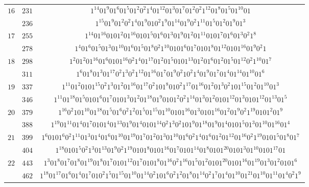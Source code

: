 \documentclass[final,3p,times]{elsarticle}
\theoremstyle{definition}
\begin{document}
\begin{appendix}
{\begin{longtable}[c]{|c|c|c|}
\hline
$16$ & $231$ & $1^{14}01^{9}01^{6}01^{5}01^{2}0^{2}1^{4}01^{12}01^{3}01^{7}01^{2}0^{2}1^{12}01^{8}01^{5}01^{10}01$\\[-1ex]
& $236$ & $1^{15}01^{9}01^{2}0^{2}1^{4}01^{9}010^{2}1^{9}01^{14}01^{9}0^{2}1^{11}01^{5}01^{2}01^{9}01^{3}$\\
\hline
$17$ & $255$ & $1^{14}01^{16}0101^{2}01^{16}0101^{5}01^{6}01^{3}01^{9}01^{2}01^{11}0101^{7}01^{6}01^{3}0^{2}1^{8}$\\[-1ex]
& $278$ & $1^{4}01^{6}01^{5}01^{3}01^{10}01^{6}01^{5}01^{8}0^{2}1^{10}0101^{6}01^{7}0101^{8}01^{12}0101^{16}01^{9}0^{2}1$\\
\hline
$18$ & $298$ & $1^{2}01^{2}01^{16}01^{6}0101^{16}0^{2}1^{4}01^{17}01^{2}01^{5}0101^{13}01^{2}01^{6}01^{2}01^{5}01^{12}0^{2}1^{10}01^{7}$\\[-1ex]
& $311$ & $1^{6}01^{8}01^{3}01^{17}0^{2}1^{3}0^{2}1^{12}01^{16}01^{7}01^{9}0^{2}10^{2}1^{4}01^{9}01^{7}01^{4}01^{14}01^{10}01^{6}$\\
\hline
$19$ & $337$ & $1^{11}01^{2}0101^{15}0^{2}1^{3}01^{2}01^{16}01^{17}0^{2}101^{8}010^{2}1^{17}01^{16}01^{2}01^{3}0^{2}101^{15}01^{2}01^{10}01^{3}$\\[-1ex]
& $346$ & $1^{11}01^{18}01^{5}0101^{6}01^{7}0101^{3}01^{2}01^{18}01^{9}0101^{2}0^{2}1^{14}01^{3}01^{2}0101^{12}01^{3}0101^{12}01^{13}01^{5}$\\
\hline
$20$ & $379$ & $1^{16}0^{2}101^{10}01^{18}01^{5}01^{6}0^{2}1^{2}01^{5}01^{15}01^{10}0101^{16}01^{3}0101^{16}01^{2}01^{9}0^{2}1^{19}0101^{2}01^{9}$\\[-1ex]
& $388$ & $1^{19}01^{11}01^{4}01^{7}0101^{4}01^{13}01^{9}01^{4}0101^{14}0^{2}1^{3}0^{2}101^{9}01^{18}01^{9}01^{4}0101^{5}01^{3}01^{10}01^{16}01^{4}$\\
\hline
$21$ & $399$ & $1^{6}0101^{6}0^{2}1^{11}01^{3}01^{4}01^{6}01^{10}01^{19}01^{7}01^{2}01^{3}01^{10}01^{6}0^{2}1^{4}01^{6}01^{2}01^{12}01^{16}0^{2}1^{19}0101^{5}01^{8}01^{7}$\\[-1ex]
& $404$ & $1^{18}0101^{5}0^{2}1^{3}01^{13}01^{9}0^{2}1^{19}0101^{8}0101^{16}01^{7}0101^{14}01^{8}0101^{20}0101^{3}01^{10}0101^{17}01$\\
\hline
$22$ & $443$ & $1^{3}01^{8}01^{7}01^{8}01^{19}01^{8}01^{7}0101^{12}01^{7}0101^{8}01^{16}0^{2}1^{16}01^{5}01^{2}0101^{20}0101^{16}01^{19}01^{3}01^{2}0101^{6}$\\[-1ex]
& $462$ & $1^{18}01^{17}01^{6}01^{4}01^{7}010^{2}1^{5}01^{15}01^{10}01^{14}0^{2}101^{6}0^{2}1^{2}01^{8}01^{14}0^{2}1^{7}01^{4}01^{10}01^{21}01^{10}01^{11}01^{4}0^{2}1^{9}$\\

\end{longtable}}
\end{appendix}
\end{document}

